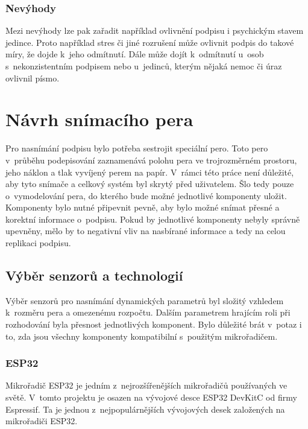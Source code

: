 \subsection*{Nevýhody}
Mezi nevýhody lze pak zařadit například ovlivnění podpisu i psychickým stavem jedince.
Proto například stres či jiné rozrušení může ovlivnit podpis do takové míry, že dojde k~jeho odmítnutí.
Dále může dojít k~odmítnutí u~osob s~nekonzistentním podpisem nebo u~jedinců, kterým nějaká nemoc či úraz ovlivnil písmo.


\chapter{Návrh snímacího pera}
Pro nasnímání podpisu bylo potřeba sestrojit speciální pero.                                        %
Toto pero v~průběhu podepisování zaznamenává polohu pera ve trojrozměrném prostoru,                 %
jeho náklon a tlak vyvíjený perem na papír.                                                         %
V~rámci této práce není důležité, aby tyto snímače a celkový systém byl skrytý před uživatelem.     %
Šlo tedy pouze o~vymodelování pera, do kterého bude možné jednotlivé komponenty uložit.             %
Komponenty bylo nutné připevnit pevně, aby bylo možné snímat přesné a korektní informace o~podpisu. %
Pokud by jednotlivé komponenty nebyly správně upevněny,                                             %
mělo by to negativní vliv na nasbírané informace a tedy na celou replikaci podpisu.                 %

\section{Výběr senzorů a technologií}
Výběr senzorů pro nasnímání dynamických parametrů byl složitý vzhledem k~rozměru pera a omezenému rozpočtu. %
Dalším parametrem hrajícím roli při rozhodování byla přesnost jednotlivých komponent.                       %
Bylo důležité brát v~potaz i to, zda jsou všechny komponenty kompatibilní s~použitým mikrořadičem.          %

\subsection*{ESP32}
Mikrořadič ESP32 je jedním z~nejrozšířenějších mikrořadičů používaných ve světě.                     %
V~tomto projektu je osazen na vývojové desce ESP32 DevKitC od firmy Espressif.                       %
Ta je jednou z~nejpopulárnějších vývojových desek založených na mikrořadiči ESP32.~\cite{Kolban2017} %

